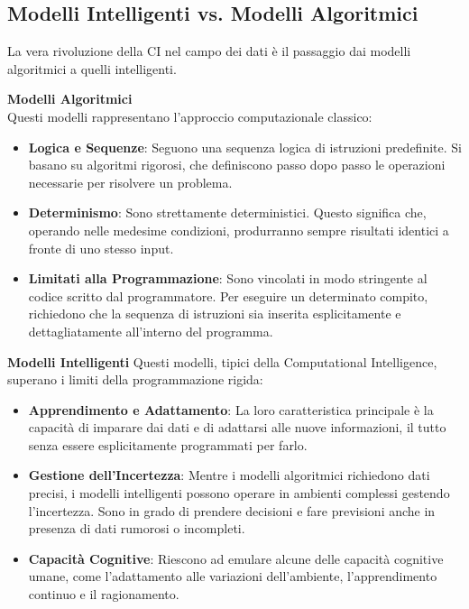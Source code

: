 \subsection{Modelli Intelligenti vs. Modelli Algoritmici}
La vera rivoluzione della CI nel campo dei dati è il passaggio dai modelli algoritmici
a quelli intelligenti. 

\textbf{Modelli Algoritmici}\\
Questi modelli rappresentano l'approccio computazionale classico:
\begin{itemize}
    \item \textbf{Logica e Sequenze}: Seguono una sequenza logica di istruzioni predefinite. 
    Si basano su algoritmi rigorosi, che definiscono passo dopo passo le operazioni necessarie 
    per risolvere un problema.
    \item \textbf{Determinismo}: Sono strettamente deterministici. 
    Questo significa che, operando nelle medesime condizioni, produrranno sempre 
    risultati identici a fronte di uno stesso input.
    \item \textbf{Limitati alla Programmazione}: Sono vincolati in modo stringente al codice scritto dal programmatore. Per eseguire un determinato compito, richiedono che la sequenza di istruzioni sia inserita esplicitamente e dettagliatamente all'interno del programma.
\end{itemize}

\textbf{Modelli Intelligenti}
Questi modelli, tipici della Computational Intelligence, 
superano i limiti della programmazione rigida:
\begin{itemize}
    \item \textbf{Apprendimento e Adattamento}: La loro caratteristica principale è 
    la capacità di imparare dai dati e di adattarsi alle nuove informazioni, 
    il tutto senza essere esplicitamente programmati per farlo.
    \item \textbf{Gestione dell'Incertezza}: Mentre i modelli algoritmici richiedono 
    dati precisi, i modelli intelligenti possono operare in ambienti complessi 
    gestendo l'incertezza. Sono in grado di prendere decisioni e fare previsioni 
    anche in presenza di dati rumorosi o incompleti.
    \item \textbf{Capacità Cognitive}: Riescono ad emulare alcune delle capacità cognitive umane, 
    come l'adattamento alle variazioni dell'ambiente, l'apprendimento continuo e il ragionamento.
\end{itemize}

